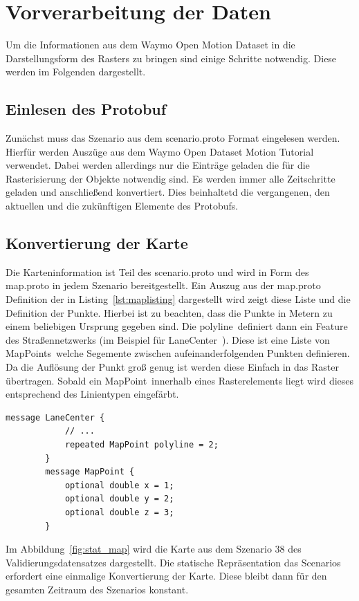 \documentclass[12pt]{article}
\begin{document}
\section{Vorverarbeitung der Daten}
\label{sec:preprocessing}
    Um die Informationen aus dem Waymo Open Motion Dataset in die Darstellungsform des Rasters zu bringen 
    sind einige Schritte notwendig. Diese werden im Folgenden dargestellt. 
    \subsection{Einlesen des Protobuf} 
        Zunächst muss das Szenario aus dem scenario.proto Format eingelesen werden. 
        Hierfür werden Auszüge aus dem Waymo Open Dataset Motion Tutorial~\cite{Tutorial2021} verwendet. 
        Dabei werden allerdings nur die Einträge geladen die für die Rasterisierung der Objekte notwendig sind. 
        Es werden immer alle Zeitschritte geladen und anschließend konvertiert. 
        Dies beinhaltetd die vergangenen, den aktuellen und die zukünftigen Elemente des Protobufs.

    \subsection{Konvertierung der Karte}
        Die Karteninformation ist Teil des scenario.proto und wird in Form des map.proto in jedem Szenario bereitgestellt.
        Ein Auszug aus der map.proto Definition der in Listing~\ref{lst:maplisting} dargestellt wird zeigt diese Liste und die Definition der Punkte. 
        Hierbei ist zu beachten, dass die Punkte in Metern zu einem beliebigen Ursprung gegeben sind. 
        Die \grqq polyline\grqq~definiert dann ein Feature des Straßennetzwerks (im Beispiel für \grqq LaneCenter\grqq~). Diese ist eine Liste von \grqq MapPoints\grqq~welche Segemente zwischen aufeinanderfolgenden Punkten definieren.
        Da die Auflösung der Punkt groß genug ist werden diese Einfach in das Raster übertragen. 
        Sobald ein \grqq MapPoint\grqq~innerhalb eines Rasterelements liegt wird dieses entsprechend des Linientypen eingefärbt.
        \vspace{0.5cm}
        \begin{lstlisting}[language=protobuf2, caption=Auszug aus map.proto, label={lst:maplisting}]
        message LaneCenter {
            // ...
            repeated MapPoint polyline = 2;
        }
        message MapPoint {
            optional double x = 1;
            optional double y = 2;
            optional double z = 3;
        }
        \end{lstlisting}
        Im Abbildung~\ref{fig:stat_map} wird die Karte aus dem Szenario 38 des Validierungsdatensatzes dargestellt. 
        Die statische Repräsentation das Scenarios erfordert eine einmalige Konvertierung der Karte. 
        Diese bleibt dann für den gesamten Zeitraum des Szenarios konstant.
\end{document}
